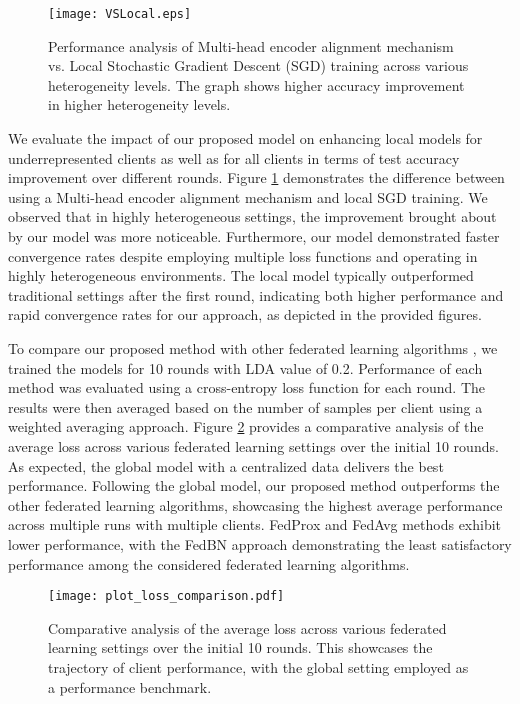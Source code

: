 \begin{figure}[htbp]
\centering
\texttt{[image: VSLocal.eps]}
\caption{Performance analysis of Multi-head encoder alignment mechanism vs. Local Stochastic Gradient Descent (SGD) training across various heterogeneity levels. The graph shows higher accuracy improvement in higher heterogeneity levels.}
\label{fig:comparison_local_sgd}
\end{figure}
We evaluate the impact of our proposed model on enhancing local models for underrepresented clients as well as for all clients in terms of test accuracy improvement over different rounds. Figure \ref{fig:comparison_local_sgd} demonstrates the difference between using a Multi-head encoder alignment mechanism and local SGD training. We observed that in highly heterogeneous settings, the improvement brought about by our model was more noticeable. Furthermore, our model demonstrated faster convergence rates despite employing multiple loss functions and operating in highly heterogeneous environments. The local model typically outperformed traditional settings after the first round, indicating both higher performance and rapid convergence rates for our approach, as depicted in the provided figures.

To compare our proposed method with other federated learning algorithms , we trained the models for 10 rounds with LDA value of 0.2. Performance of each method was evaluated using a cross-entropy loss function for each round. The results were then averaged based on the number of samples per client using a weighted averaging approach. Figure \ref{fig:avg_loss_comparison} provides a comparative analysis of the average loss across various federated learning settings over the initial 10 rounds. As expected, the global model with a centralized data delivers the best performance. Following the global model, our proposed method outperforms the other federated learning algorithms, showcasing the highest average performance across multiple runs with multiple clients. FedProx and FedAvg methods exhibit lower performance, with the FedBN approach demonstrating the least satisfactory performance among the considered federated learning algorithms.


\begin{figure}[htbp]
\centering
\texttt{[image: plot\_loss\_comparison.pdf]}
\caption{Comparative analysis of the average loss across various federated learning settings over the initial 10 rounds. This showcases the trajectory of client performance, with the global setting employed as a performance benchmark.}
\label{fig:avg_loss_comparison}
\end{figure} 

